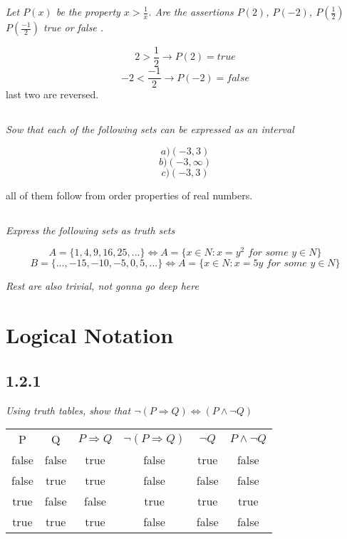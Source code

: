 \documentclass[11pt,oneside,titlepage]{book}
\DeclareMathOperator \lra {\Leftrightarrow}
\DeclareMathOperator \ra {\Rightarrow}
\begin{document}
\textit{Let $P(x)$ be the property $x > \frac 1 x$. Are the assertions $P(2)$, $P(-2)$,
  $P(\frac 1 2)$ $P( \frac{-1}{2})$ true or false .}

$$2 > \frac 1 2 \to P(2) = true$$
$$-2 < \frac{-1}{2} \to P(-2) = false$$
last two are reversed.

\subsection{}

\textit{Sow that each of the following sets can be expressed as an interval}

$$a) (-3, 3)$$
$$b) (-3, \infty)$$
$$c) (-3, 3)$$

all of them follow from order properties of real numbers.

\subsection{}

\textit{Express the following sets as truth sets}

$$A = \{1, 4, 9, 16, 25, ...\} \iff A = \{x \in N: x = y^2 \textit{ for some } y \in N\}$$
$$B = \{..., -15, -10, -5, 0, 5, ... \} \iff A = \{x \in N: x = 5y  \textit{ for some } y \in N\}$$

\textit{Rest are also trivial, not gonna go deep here}

\section{Logical Notation}

\subsection*{1.2.1}

\textit{Using truth tables, show that $\neg(P \ra Q) \lra (P \land \neg Q)$}

\begin{center}
  \begin{tabular}{c| c| c| c| c| c|}
    P & Q & $P \ra Q$ & $\neg(P \ra Q)$ & $\neg Q$ & $P \land \neg Q$ \\
    false & false & true & false & true & false \\
    false & true & true & false & false & false \\
    true & false & false & true & true & true \\
    true & true & true & false & false & false \\
  \end{tabular}  
\end{center}
\end{document}
